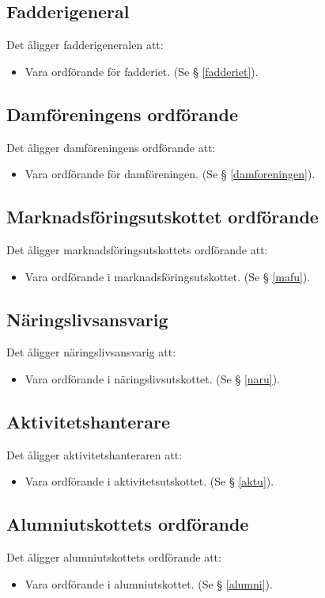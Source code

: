 \documentclass{datateknologsektionen-document}
\begin{document}
\subsection{Fadderigeneral}
Det åligger fadderigeneralen att:
\begin{itemize}
  \item Vara ordförande för fadderiet. (Se § \ref{fadderiet}).
\end{itemize}
\subsection{Damföreningens ordförande}
Det åligger damföreningens ordförande att:
\begin{itemize}
  \item Vara ordförande för damföreningen. (Se § \ref{damforeningen}).
\end{itemize}
\subsection{Marknadsföringsutskottet ordförande}
Det åligger marknadsföringsutskottets ordförande att:
\begin{itemize}
  \item Vara ordförande i marknadsföringsutskottet. (Se § \ref{mafu}).
\end{itemize}
\subsection{Näringslivsansvarig}
Det åligger näringslivsansvarig att:
\begin{itemize}
  \item Vara ordförande i näringslivsutskottet. (Se § \ref{naru}).
\end{itemize}
\subsection{Aktivitetshanterare}
Det åligger aktivitetshanteraren att:
\begin{itemize}
  \item Vara ordförande i aktivitetsutskottet. (Se § \ref{aktu}).
\end{itemize}


\subsection{Alumniutskottets ordförande}
Det åligger alumniutskottets ordförande att:
\begin{itemize}
  \item Vara ordförande i alumniutskottet. (Se § \ref{alumni}).
\end{itemize}
\end{document}
